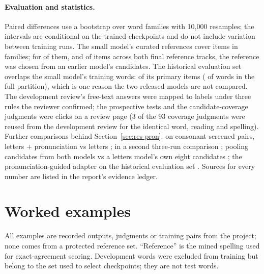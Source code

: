 \documentclass[10pt,a4paper,twocolumn]{article}
\begin{document}
\paragraph{Evaluation and statistics.} Paired differences use a bootstrap over word families with 10,000
resamples; the intervals are conditional on the trained checkpoints and do not include variation between training
runs. The small model's curated references cover  items in  families; for
 of them, and  of  items across both final reference tracks, the
reference was chosen from an earlier model's candidates. The historical evaluation set overlaps the small model's
training words:  of its  primary items ( of  words in
the full partition), which is one reason the two released models are not compared. The development review's free-text
answers were mapped to labels under three rules the reviewer confirmed; the prospective tests and the
candidate-coverage judgments were clicks on a review page (3 of the 93 coverage judgments were reused from the
development review for the identical word, reading and spelling). Further comparisons behind
Section~\ref{sec:res-pron}: on consonant-screened pairs, letters + pronunciation vs letters 
; in a second three-run comparison  ; pooling candidates from both
models vs a letters model's own eight candidates  ; the pronunciation-guided adapter
on the historical evaluation set  . Sources for every number are listed in the
report's evidence ledger.

\clearpage
\section{Worked examples}
\label{app:examples}

All examples are recorded outputs, judgments or training pairs from the project; none comes from a protected
reference set. ``Reference'' is the mined spelling used for exact-agreement scoring. Development words were
excluded from training but belong to the set used to select checkpoints; they are not test words.
\end{document}
